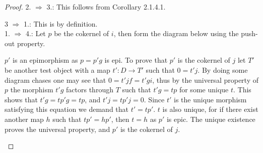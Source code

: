 \begin{proof}
        2. $\Rightarrow$ 3.: This follows from Corollary 2.1.4.1.
        
        3 $\Rightarrow$ 1.: This is by definition. \\

        1. $\Rightarrow$ 4.: Let $p$ be the cokernel of $i$, then form the diagram below using the push-out property.
        \begin{center}
        \end{center}
        $p'$ is an epimorphism as $p=p'g$ is epi. To prove that $p'$ is the cokernel of $j$ let $T'$ be another test object with a map $t':D\rightarrow T'$ such that $0 = t'j$. By doing some diagram chases one may see that $0=t'jf=t'gi$, thus by the universal property of $p$ the morphism $t'g$ factors through $T$ such that $t'g=tp$ for some unique $t$. This shows that $t'g=tp'g=tp$, and $t'j=tp'j=0$. Since $t'$ is the unique morphism satisfying this equation we demand that $t'=tp'$. $t$ is also unique, for if there exist another map $h$ such that $tp'=hp'$, then $t=h$ as $p'$ is epic. The unique existence proves the universal property, and $p'$ is the cokernel of $j$.
        \begin{center}
        \end{center} 
 

\end{proof}
